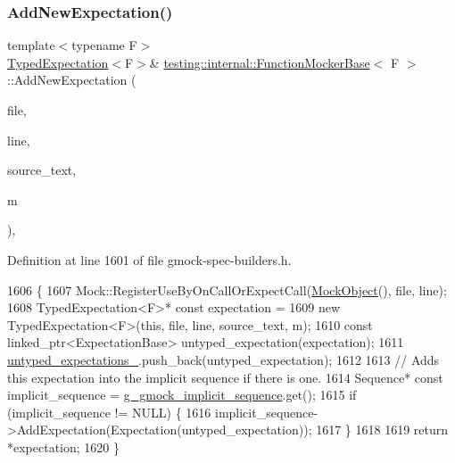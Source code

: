 \subsubsection{\texorpdfstring{Add\+New\+Expectation()}{AddNewExpectation()}}
{\footnotesize\ttfamily template$<$typename F$>$ \\
\hyperlink{classtesting_1_1internal_1_1TypedExpectation}{Typed\+Expectation}$<$F$>$\& \hyperlink{classtesting_1_1internal_1_1FunctionMockerBase}{testing\+::internal\+::\+Function\+Mocker\+Base}$<$ F $>$\+::Add\+New\+Expectation (\begin{DoxyParamCaption}\item[{const char $\ast$}]{file,  }\item[{int}]{line,  }\item[{const \hyperlink{namespacetesting_1_1internal_a8e8ff5b11e64078831112677156cb111}{string} \&}]{source\+\_\+text,  }\item[{const \hyperlink{classtesting_1_1internal_1_1FunctionMockerBase_ab790bcb1dcf57fa6659365386723ae5a}{Argument\+Matcher\+Tuple} \&}]{m }\end{DoxyParamCaption})\hspace{0.3cm}{\ttfamily [inline]}, {\ttfamily [protected]}}



Definition at line 1601 of file gmock-\/spec-\/builders.\+h.


\begin{DoxyCode}
1606                                               \{
1607     Mock::RegisterUseByOnCallOrExpectCall(\hyperlink{classtesting_1_1internal_1_1UntypedFunctionMockerBase_a71863dd67193a7082078d5b366d5ce51}{MockObject}(), file, line);
1608     TypedExpectation<F>* \textcolor{keyword}{const} expectation =
1609         \textcolor{keyword}{new} TypedExpectation<F>(\textcolor{keyword}{this}, file, line, source\_text, m);
1610     \textcolor{keyword}{const} linked\_ptr<ExpectationBase> untyped\_expectation(expectation);
1611     \hyperlink{classtesting_1_1internal_1_1UntypedFunctionMockerBase_aae4a42a4bace1fcb0cd4bdf1ddd40277}{untyped\_expectations\_}.push\_back(untyped\_expectation);
1612 
1613     \textcolor{comment}{// Adds this expectation into the implicit sequence if there is one.}
1614     Sequence* \textcolor{keyword}{const} implicit\_sequence = \hyperlink{namespacetesting_1_1internal_af4407fe8aeb1e43b2f58940736a20590}{g\_gmock\_implicit\_sequence}.get();
1615     \textcolor{keywordflow}{if} (implicit\_sequence != NULL) \{
1616       implicit\_sequence->AddExpectation(Expectation(untyped\_expectation));
1617     \}
1618 
1619     \textcolor{keywordflow}{return} *expectation;
1620   \}
\end{DoxyCode}
\mbox{\label{classtesting_1_1internal_1_1FunctionMockerBase_a22ece3b6e8d24f11d8f4ba9c17b737c4}} 
